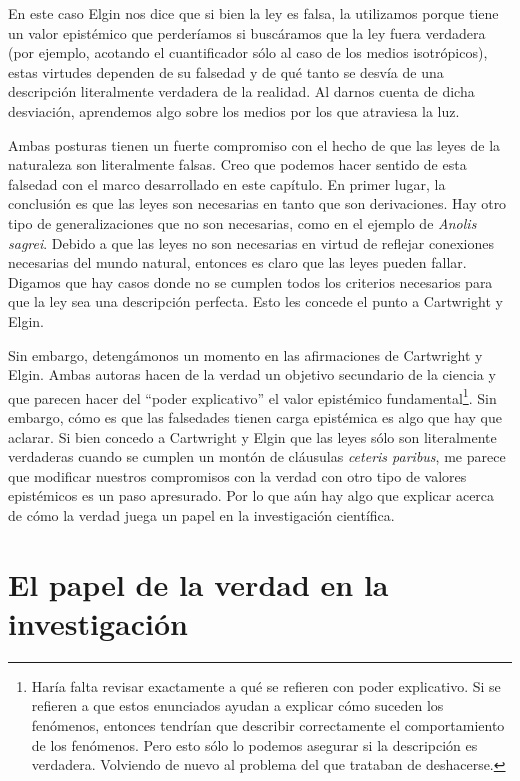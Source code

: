 En este caso Elgin nos dice que si bien la ley es falsa, la utilizamos porque tiene un valor epistémico que perderíamos si buscáramos que la ley fuera verdadera (por ejemplo, acotando el cuantificador sólo al caso de los medios isotrópicos), estas virtudes dependen de su falsedad y de qué tanto se desvía de una descripción literalmente verdadera de la realidad. Al darnos cuenta de dicha desviación, aprendemos algo sobre los medios por los que atraviesa la luz.

Ambas posturas tienen un fuerte compromiso con el hecho de que las leyes de la naturaleza son literalmente falsas. Creo que podemos hacer sentido de esta falsedad con el marco desarrollado en este capítulo. En primer lugar, la conclusión es que las leyes son necesarias en tanto que son derivaciones. Hay otro tipo de generalizaciones que no son necesarias, como en el ejemplo de \emph{Anolis sagrei}. Debido a que las leyes no son necesarias en virtud de reflejar conexiones necesarias del mundo natural, entonces es claro que las leyes pueden fallar. Digamos que hay casos donde no se cumplen todos los criterios necesarios para que la ley sea una descripción perfecta. Esto les concede el punto a Cartwright y Elgin.

Sin embargo, detengámonos un momento en las afirmaciones de Cartwright y Elgin. Ambas autoras hacen de la verdad un objetivo secundario de la ciencia y que parecen hacer del ``poder explicativo'' el valor epistémico fundamental\footnote{Haría falta revisar exactamente a qué se refieren con poder explicativo. Si se refieren a que estos enunciados ayudan a explicar cómo suceden los fenómenos, entonces tendrían que describir correctamente el comportamiento de los fenómenos. Pero esto sólo lo podemos asegurar si la descripción es verdadera. Volviendo de nuevo al problema del que trataban de deshacerse.}. Sin embargo, cómo es que las falsedades tienen carga epistémica es algo que hay que aclarar. Si bien concedo a Cartwright y Elgin que las leyes sólo son literalmente verdaderas cuando se cumplen un montón de cláusulas \emph{ceteris paribus}, me parece que modificar nuestros compromisos con la verdad con otro tipo de valores epistémicos es un paso apresurado. Por lo que aún hay algo que explicar acerca de cómo la verdad juega un papel en la investigación científica.

\section{El papel de la verdad en la investigación}

